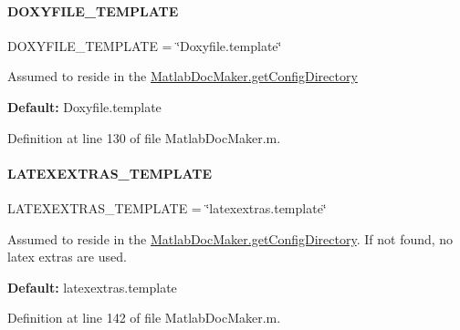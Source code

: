 \paragraph{\texorpdfstring{D\+O\+X\+Y\+F\+I\+L\+E\+\_\+\+T\+E\+M\+P\+L\+A\+TE}{DOXYFILE\_TEMPLATE}}
{\footnotesize\ttfamily D\+O\+X\+Y\+F\+I\+L\+E\+\_\+\+T\+E\+M\+P\+L\+A\+TE = \char`\"{}Doxyfile.\+template\char`\"{}\hspace{0.3cm}{\ttfamily [static]}}

Assumed to reside in the \hyperlink{class_matlab_doc_maker_ac201c45057310993a26a114403254c41}{Matlab\+Doc\+Maker.\+get\+Config\+Directory}

{\bfseries Default\+:} {\ttfamily Doxyfile.\+template} 

Definition at line 130 of file Matlab\+Doc\+Maker.\+m.

\mbox{\label{class_matlab_doc_maker_a7098bea4dc0a3eea782a026f966a4d0d}} 
\paragraph{\texorpdfstring{L\+A\+T\+E\+X\+E\+X\+T\+R\+A\+S\+\_\+\+T\+E\+M\+P\+L\+A\+TE}{LATEXEXTRAS\_TEMPLATE}}
{\footnotesize\ttfamily L\+A\+T\+E\+X\+E\+X\+T\+R\+A\+S\+\_\+\+T\+E\+M\+P\+L\+A\+TE = \char`\"{}latexextras.\+template\char`\"{}\hspace{0.3cm}{\ttfamily [static]}}

Assumed to reside in the \hyperlink{class_matlab_doc_maker_ac201c45057310993a26a114403254c41}{Matlab\+Doc\+Maker.\+get\+Config\+Directory}. If not found, no latex extras are used.

{\bfseries Default\+:} {\ttfamily latexextras.\+template} 

Definition at line 142 of file Matlab\+Doc\+Maker.\+m.

\mbox{\label{class_matlab_doc_maker_a56e0e68444b800bc37eb5d9e9deeade0}} 
